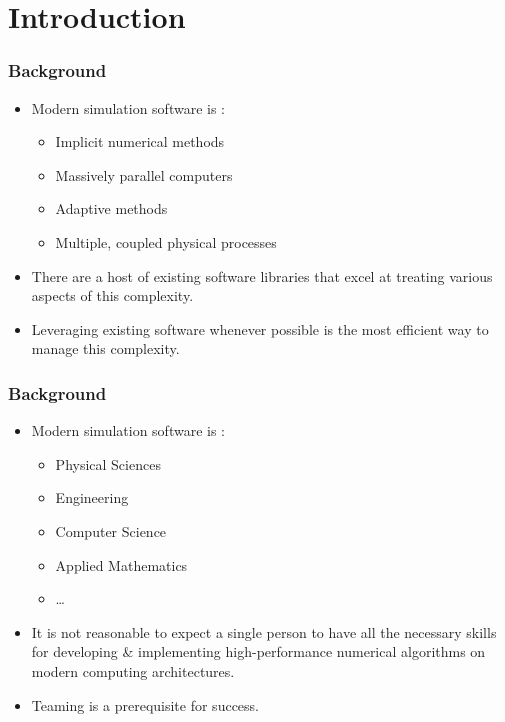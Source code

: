 

%




\section{Introduction}
\frame
{
  \frametitle{Background}

  \begin{itemize}
  \item Modern simulation software is :
    \begin{itemize}
    \item Implicit numerical methods
    \item Massively parallel computers
    \item Adaptive methods
    \item Multiple, coupled physical processes
    \end{itemize}
  \item There are a host of existing software libraries that excel at treating various aspects of this complexity.
  \item Leveraging existing software whenever possible is the most efficient way to manage this complexity.

  \end{itemize}
}




\frame
{
  \frametitle{Background}

  \begin{itemize}
  \item Modern simulation software is :
    \begin{itemize}
    \item Physical Sciences
    \item Engineering
    \item Computer Science
    \item Applied Mathematics
    \item \ldots
    \end{itemize}
  \item It is not reasonable to expect a single person to have all the necessary skills for developing \& implementing high-performance numerical algorithms on modern computing architectures.
  \item Teaming is a prerequisite for success.
  \end{itemize}
}


